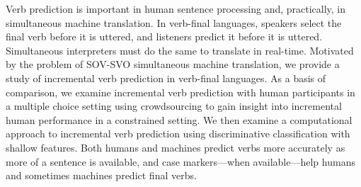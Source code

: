 Verb prediction is important in human sentence processing and, practically, in simultaneous machine translation. In verb-final languages, speakers select the final verb before it is uttered, and listeners predict it before it is uttered. Simultaneous interpreters must do the same to translate in real-time. Motivated by the problem of SOV-SVO simultaneous machine translation, we provide a study of incremental verb prediction in verb-final languages. As a basis of comparison, we examine incremental verb prediction with human participants in a multiple choice setting using crowdsourcing to gain insight into incremental human performance in a constrained setting. We then examine a computational approach to incremental verb prediction using discriminative classification with shallow features. Both humans and machines predict verbs more accurately as more of a sentence is available, and case markers—when available—help humans and sometimes machines predict final verbs.
